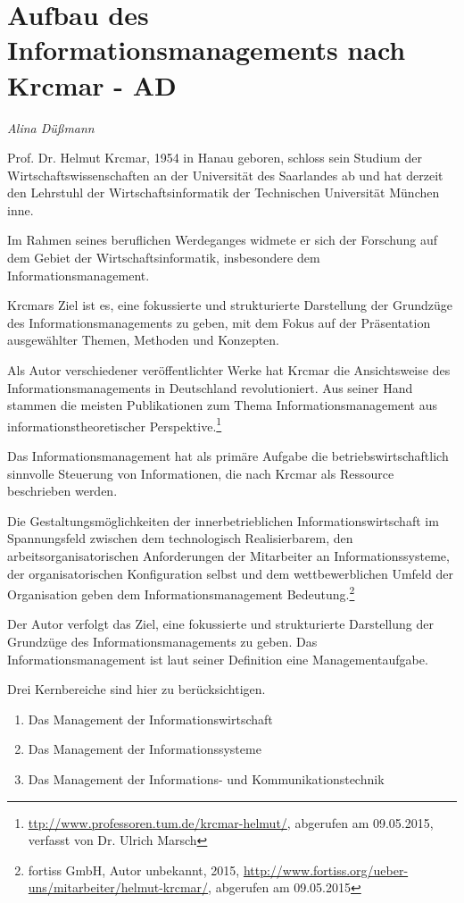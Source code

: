 \section{Aufbau des Informationsmanagements nach Krcmar - AD}
\textit{Alina Düßmann}


Prof. Dr. Helmut Krcmar, 1954 in Hanau geboren, schloss sein Studium der Wirtschaftswissenschaften an der Universität des Saarlandes ab und hat derzeit den Lehrstuhl der Wirtschaftsinformatik der Technischen Universität München inne.

Im Rahmen seines beruflichen Werdeganges widmete er sich der Forschung  auf dem Gebiet der Wirtschaftsinformatik, insbesondere dem Informationsmanagement.

Krcmars Ziel ist es, eine fokussierte und strukturierte Darstellung der Grundzüge des Informationsmanagements zu geben, mit dem Fokus auf der Präsentation ausgewählter Themen, Methoden und Konzepten.

Als Autor verschiedener veröffentlichter Werke hat Krcmar die Ansichtsweise des
Informationsmanagements in Deutschland revolutioniert. Aus seiner Hand stammen die
meisten Publikationen zum Thema Informationsmanagement aus informationstheoretischer
Perspektive.\footnote{\url{ttp://www.professoren.tum.de/krcmar-helmut/}, abgerufen am 09.05.2015, verfasst von Dr. Ulrich Marsch}

Das Informationsmanagement hat als primäre Aufgabe die betriebswirtschaftlich sinnvolle Steuerung von Informationen, die nach Krcmar als Ressource beschrieben werden.

Die Gestaltungsmöglichkeiten der innerbetrieblichen Informationswirtschaft im Spannungsfeld zwischen dem technologisch Realisierbarem, den arbeitsorganisatorischen Anforderungen der Mitarbeiter an Informationssysteme, der organisatorischen Konfiguration selbst und dem wettbewerblichen Umfeld der Organisation geben dem Informationsmanagement Bedeutung.\footnote{fortiss GmbH, Autor unbekannt, 2015, \url{http://www.fortiss.org/ueber-uns/mitarbeiter/helmut-krcmar/}, abgerufen am 09.05.2015}

Der Autor verfolgt das Ziel, eine fokussierte und strukturierte Darstellung der Grundzüge des Informationsmanagements zu geben. Das Informationsmanagement ist laut seiner Definition eine Managementaufgabe.

Drei Kernbereiche sind hier zu berücksichtigen.
\begin{enumerate}
	\item Das Management der Informationswirtschaft
	\item Das Management der Informationssysteme
	\item Das Management der Informations- und Kommunikationstechnik
\end{enumerate}

